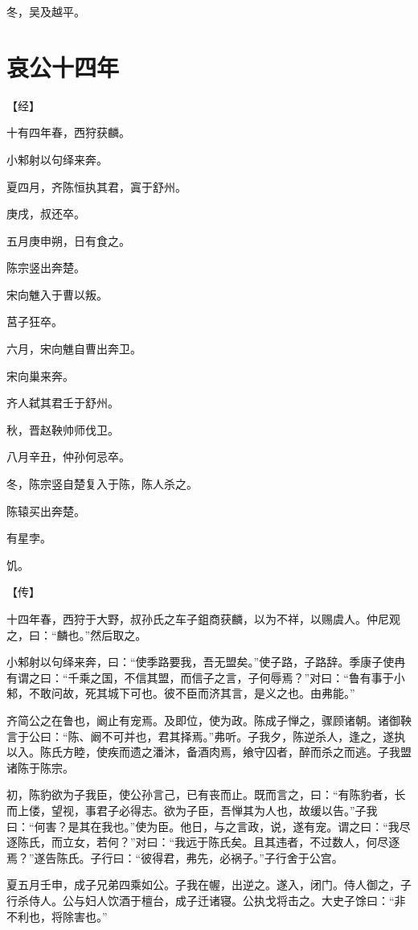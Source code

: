 \documentclass[a4paper,12pt,UTF8,twoside]{ctexbook}
\begin{document}
冬，吴及越平。


\section{哀公十四年}


【经】

十有四年春，西狩获麟。

小邾射以句绎来奔。

夏四月，齐陈恒执其君，寘于舒州。

庚戌，叔还卒。

五月庚申朔，日有食之。

陈宗竖出奔楚。

宋向魋入于曹以叛。

莒子狂卒。

六月，宋向魋自曹出奔卫。

宋向巢来奔。

齐人弑其君壬于舒州。

秋，晋赵鞅帅师伐卫。

八月辛丑，仲孙何忌卒。

冬，陈宗竖自楚复入于陈，陈人杀之。

陈辕买出奔楚。

有星孛。

饥。

【传】

十四年春，西狩于大野，叔孙氏之车子鉏商获麟，以为不祥，以赐虞人。仲尼观之，曰：“麟也。”然后取之。

小邾射以句绎来奔，曰：“使季路要我，吾无盟矣。”使子路，子路辞。季康子使冉有谓之曰：“千乘之国，不信其盟，而信子之言，子何辱焉？”对曰：“鲁有事于小邾，不敢问故，死其城下可也。彼不臣而济其言，是义之也。由弗能。”

齐简公之在鲁也，阚止有宠焉。及即位，使为政。陈成子惮之，骤顾诸朝。诸御鞅言于公曰：“陈、阚不可并也，君其择焉。”弗听。子我夕，陈逆杀人，逢之，遂执以入。陈氏方睦，使疾而遗之潘沐，备酒肉焉，飨守囚者，醉而杀之而逃。子我盟诸陈于陈宗。

初，陈豹欲为子我臣，使公孙言己，已有丧而止。既而言之，曰：“有陈豹者，长而上偻，望视，事君子必得志。欲为子臣，吾惮其为人也，故缓以告。”子我曰：“何害？是其在我也。”使为臣。他日，与之言政，说，遂有宠。谓之曰：“我尽逐陈氏，而立女，若何？”对曰：“我远于陈氏矣。且其违者，不过数人，何尽逐焉？”遂告陈氏。子行曰：“彼得君，弗先，必祸子。”子行舍于公宫。

夏五月壬申，成子兄弟四乘如公。子我在幄，出逆之。遂入，闭门。侍人御之，子行杀侍人。公与妇人饮酒于檀台，成子迁诸寝。公执戈将击之。大史子馀曰：“非不利也，将除害也。”
\end{document}
